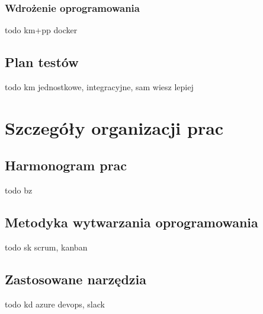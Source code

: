 \documentclass{article}
\begin{document}
	\subsubsection{Wdrożenie oprogramowania}
	todo km+pp docker
	  
	\subsection{Plan testów}
	todo km jednostkowe, integracyjne, sam wiesz lepiej
 
	\section{Szczegóły organizacji prac}  
 
	\subsection{Harmonogram prac}
	todo bz
 
	\subsection{Metodyka wytwarzania oprogramowania}
	todo sk scrum, kanban
	
	\subsection{Zastosowane narzędzia}
	todo kd azure devops, slack
 
\end{document}
